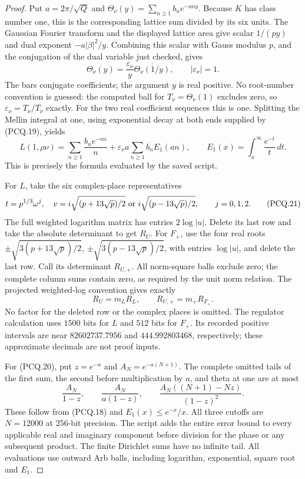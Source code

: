 \begin{proof}
Put $a=2\pi/\sqrt Q$ and
$\Theta_\nu(y)=\sum_{n\geq1}b_n e^{-any}$.
Because $K$ has class number one, this is the corresponding
lattice sum divided by its six units.  The Gaussian Fourier transform
and the displayed lattice area give scalar $1/(py)$ and dual
exponent $-a|\beta|^2/y$.  Combining this scalar with Gauss modulus
$p$, and the conjugation of the dual variable just checked, gives
\[
 \Theta_\nu(y)=\frac{\varepsilon_\nu}{y}
             \overline{\Theta_\nu(1/y)},\qquad
                         |\varepsilon_\nu|=1.
 \tag{PCQ.19}
\]
The bars conjugate coefficients; the argument $y$ is real positive.
No root-number convention is guessed: the computed ball for
$T_\nu=\Theta_\nu(1)$ excludes zero, so
$\varepsilon_\nu=T_\nu/\overline{T_\nu}$ exactly.
For the two real coefficient sequences this is one.
Splitting the Mellin integral at one, using exponential decay at
both ends supplied by (PCQ.19), yields
\[
 L(1,\rho\nu)=\sum_{n\geq1}\frac{b_n e^{-an}}n
       +\varepsilon_\nu a
                         \sum_{n\geq1}\overline{b_n}E_1(an),
 \qquad E_1(x)=\int_x^\infty\frac{e^{-t}}t\,dt.
 \tag{PCQ.20}
\]
This is precisely the formula evaluated by the saved script.

For $L$, take the six complex-place representatives
\[
 t=p^{1/3}\omega^j,\quad
 v=i\sqrt{(p+13\sqrt p)/2}\ \hbox{or}\
 i\sqrt{(p-13\sqrt p)/2},\qquad j=0,1,2.
 \tag{PCQ.21}
\]
The full weighted logarithm matrix has entries $2\log|u|$.
Delete its last row and take the absolute determinant to get $R_U$.
For $F_+$, use the four real roots
$\pm\sqrt{3(p+13\sqrt p)/2}$,
$\pm\sqrt{3(p-13\sqrt p)/2}$, with entries $\log|u|$,
and delete the last row.  Call its determinant $R_{U,+}$.
All norm-square balls exclude zero; the complete column sums
contain zero, as required by the unit norm relation.
The projected weighted-log convention gives exactly
\[
                      R_U=m_LR_L,\qquad
                      R_{U,+}=m_+R_{F_+}.
 \tag{PCQ.22}
\]
No factor for the deleted row or the complex places is omitted.
The regulator calculation uses $1500$ bits for $L$ and $512$ bits
for $F_+$.  Its recorded positive intervals are near
$82602737.7956$ and $444.992803468$, respectively; these
approximate decimals are not proof inputs.

For (PCQ.20), put $z=e^{-a}$ and $A_N=e^{-a(N+1)}$.
The complete omitted tails of the first sum, the second before
multiplication by $a$, and theta at one are at most
\[
 \frac{A_N}{1-z},\qquad
 \frac{A_N}{a(1-z)},\qquad
                 \frac{A_N((N+1)-Nz)}{(1-z)^2}.
 \tag{PCQ.23}
\]
These follow from (PCQ.18) and $E_1(x)\leq e^{-x}/x$.
All three cutoffs are $N=12000$ at $256$-bit precision.
The script adds the entire error bound to every applicable real
and imaginary component before division for the phase or any
subsequent product.  The finite Dirichlet sums have no infinite
tail.  All evaluations use outward Arb balls, including logarithm,
exponential, square root and $E_1$.


\end{proof}
